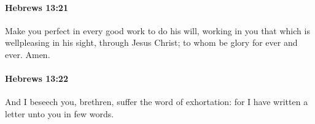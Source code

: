 		\paragraph{Hebrews 13:21} %
			\label{HEBREWS-13-21}

			Make you perfect in every good work to do his will, working in you that which is wellpleasing in his sight, through Jesus Christ; to whom be glory for ever and ever. Amen.

			\begin{framed}
			\scriptsize
				\begin{compactdesc}
					\item[SBLG] 
				\end{compactdesc}
			\end{framed}

		\paragraph{Hebrews 13:22} %
			\label{HEBREWS-13-22}

			And I beseech you, brethren, suffer the word of exhortation: for I have written a letter unto you in few words.

